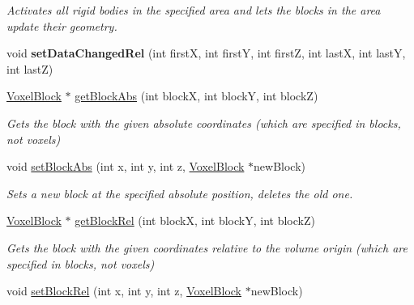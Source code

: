 \begin{DoxyCompactItemize}
\begin{DoxyCompactList}\small\item\em \-Activates all rigid bodies in the specified area and lets the blocks in the area update their geometry. \end{DoxyCompactList}\item 
\hypertarget{classVoxelVolume_a5a0b9d0a2b18610cdfe992cddbf55db8}{
void {\bfseries set\-Data\-Changed\-Rel} (int first\-X, int first\-Y, int first\-Z, int last\-X, int last\-Y, int last\-Z)}
\label{d0/d1c/classVoxelVolume_a5a0b9d0a2b18610cdfe992cddbf55db8}

\item 
\hypertarget{classVoxelVolume_a02ed38f446c2667cdd2f45dd8cf70a73}{
\hyperlink{classVoxelBlock}{\-Voxel\-Block} $\ast$ \hyperlink{classVoxelVolume_a02ed38f446c2667cdd2f45dd8cf70a73}{get\-Block\-Abs} (int block\-X, int block\-Y, int block\-Z)}
\label{d0/d1c/classVoxelVolume_a02ed38f446c2667cdd2f45dd8cf70a73}

\begin{DoxyCompactList}\small\item\em \-Gets the block with the given absolute coordinates (which are specified in blocks, not voxels) \end{DoxyCompactList}\item 
\hypertarget{classVoxelVolume_a3e1364cdd540d28484c455774b626a2b}{
void \hyperlink{classVoxelVolume_a3e1364cdd540d28484c455774b626a2b}{set\-Block\-Abs} (int x, int y, int z, \hyperlink{classVoxelBlock}{\-Voxel\-Block} $\ast$new\-Block)}
\label{d0/d1c/classVoxelVolume_a3e1364cdd540d28484c455774b626a2b}

\begin{DoxyCompactList}\small\item\em \-Sets a new block at the specified absolute position, deletes the old one. \end{DoxyCompactList}\item 
\hypertarget{classVoxelVolume_afa632bf5c41b2f6e64accc9dbd855818}{
\hyperlink{classVoxelBlock}{\-Voxel\-Block} $\ast$ \hyperlink{classVoxelVolume_afa632bf5c41b2f6e64accc9dbd855818}{get\-Block\-Rel} (int block\-X, int block\-Y, int block\-Z)}
\label{d0/d1c/classVoxelVolume_afa632bf5c41b2f6e64accc9dbd855818}

\begin{DoxyCompactList}\small\item\em \-Gets the block with the given coordinates relative to the volume origin (which are specified in blocks, not voxels) \end{DoxyCompactList}\item 
\hypertarget{classVoxelVolume_aca0cf601c7bc8076cd44638576d555d1}{
void \hyperlink{classVoxelVolume_aca0cf601c7bc8076cd44638576d555d1}{set\-Block\-Rel} (int x, int y, int z, \hyperlink{classVoxelBlock}{\-Voxel\-Block} $\ast$new\-Block)}
\label{d0/d1c/classVoxelVolume_aca0cf601c7bc8076cd44638576d555d1}


\end{DoxyCompactItemize}
